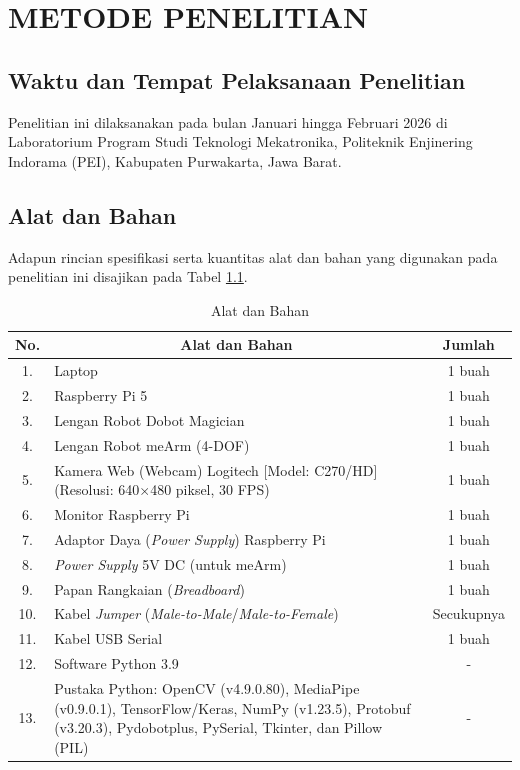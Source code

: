 \chapter{METODE PENELITIAN}

\section{Waktu dan Tempat Pelaksanaan Penelitian}
Penelitian ini dilaksanakan pada bulan Januari hingga Februari 2026 di Laboratorium Program Studi Teknologi Mekatronika, Politeknik Enjinering Indorama (PEI), Kabupaten Purwakarta, Jawa Barat.

\section{Alat dan Bahan}
Adapun rincian spesifikasi serta kuantitas alat dan bahan yang digunakan pada penelitian ini disajikan pada Tabel \ref{tab:alat_bahan}.

\begin{table}[htbp]
\centering
\caption{Alat dan Bahan}
\label{tab:alat_bahan}
\begin{tabular}{|c|p{8.5cm}|c|}
\hline
\textbf{No.} & \multicolumn{1}{c|}{\textbf{Alat dan Bahan}} & \textbf{Jumlah} \\ \hline
1. & Laptop & 1 buah \\ \hline
2. & Raspberry Pi 5 & 1 buah \\ \hline
3. & Lengan Robot Dobot Magician & 1 buah \\ \hline
4. & Lengan Robot meArm (4-DOF) & 1 buah \\ \hline
5. & Kamera Web (Webcam) Logitech [Model: C270/HD] \newline (Resolusi: 640$\times$480 piksel, 30 FPS) & 1 buah \\ \hline
6. & Monitor Raspberry Pi & 1 buah \\ \hline
7. & Adaptor Daya (\textit{Power Supply}) Raspberry Pi & 1 buah \\ \hline
8. & \textit{Power Supply} 5V DC (untuk meArm) & 1 buah \\ \hline
9. & Papan Rangkaian (\textit{Breadboard}) & 1 buah \\ \hline
10. & Kabel \textit{Jumper} (\textit{Male-to-Male}/\textit{Male-to-Female}) & Secukupnya \\ \hline
11. & Kabel USB Serial & 1 buah \\ \hline
12. & Software Python 3.9 & - \\ \hline
13. & Pustaka Python: OpenCV (v4.9.0.80), MediaPipe (v0.9.0.1), TensorFlow/Keras, NumPy (v1.23.5), Protobuf (v3.20.3), Pydobotplus, PySerial, Tkinter, dan Pillow (PIL) & - \\ \hline
\end{tabular}
\end{table}

